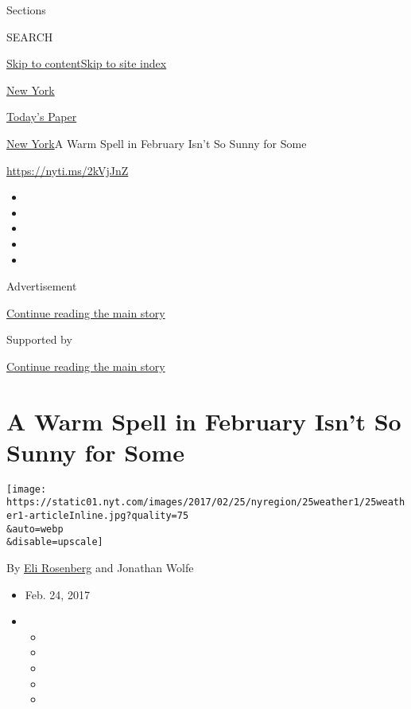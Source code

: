 Sections

SEARCH

\protect\hyperlink{site-content}{Skip to
content}\protect\hyperlink{site-index}{Skip to site index}

\href{https://www.nytimes.com/section/nyregion}{New York}

\href{https://myaccount.nytimes.com/auth/login?response_type=cookie\&client_id=vi}{}

\href{https://www.nytimes.com/section/todayspaper}{Today's Paper}

\href{/section/nyregion}{New York}\textbar{}A Warm Spell in February
Isn't So Sunny for Some

\url{https://nyti.ms/2kVjJnZ}

\begin{itemize}
\item
\item
\item
\item
\item
\end{itemize}

Advertisement

\protect\hyperlink{after-top}{Continue reading the main story}

Supported by

\protect\hyperlink{after-sponsor}{Continue reading the main story}

\hypertarget{a-warm-spell-in-february-isnt-so-sunny-for-some}{%
\section{A Warm Spell in February Isn't So Sunny for
Some}\label{a-warm-spell-in-february-isnt-so-sunny-for-some}}

\texttt{[image: https://static01.nyt.com/images/2017/02/25/nyregion/25weather1/25weather1-articleInline.jpg?quality=75\\\&auto=webp\\\&disable=upscale]}

By \href{https://www.nytimes.com/by/eli-rosenberg}{Eli Rosenberg} and
Jonathan Wolfe

\begin{itemize}
\item
  Feb. 24, 2017
\item
  \begin{itemize}
  \item
  \item
  \item
  \item
  \item
  \end{itemize}
\end{itemize}

